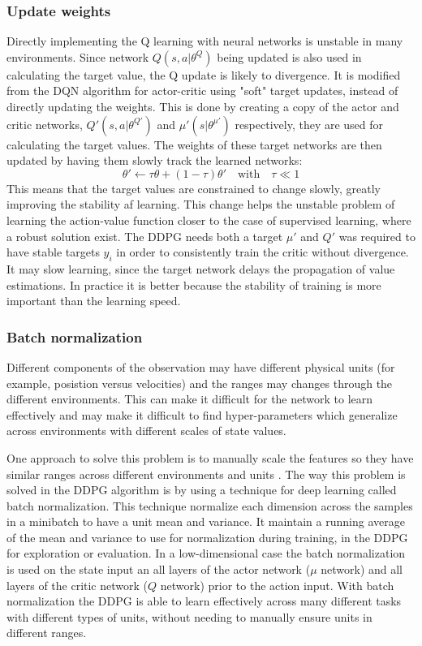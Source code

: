 \subsubsection{Update weights}
Directly implementing the Q learning with neural networks is unstable in many environments. Since network $Q(s,a|\theta^Q)$ being updated is also used in calculating the target value, the Q update is likely to divergence. It is modified from the DQN algorithm for actor-critic using "soft" target updates, instead of directly updating the weights. This is done by creating a copy of the actor and critic networks, $Q'(s,a|\theta^{Q'})$ and $\mu'(s|\theta^{\mu'})$ respectively, they are used for calculating the target values. The weights of these target networks are then updated by having them slowly track the learned networks:
\begin{equation}
\theta' \leftarrow \tau \theta + (1-\tau)\theta'   \quad \textrm{with} \quad \tau \ll 1 
\end{equation}   
This means that the target values are constrained to change slowly, greatly improving the stability af learning. This change helps the unstable problem of learning the action-value function closer to the case of supervised learning, where a robust solution exist. The DDPG needs both a target $\mu'$ and $Q'$ was required to have stable targets $y_i$ in order to consistently train the critic without divergence. It may slow learning, since the target network delays the propagation of value estimations. In practice it is better because the stability of training is more important than the learning speed.

\subsubsection{Batch normalization}
Different components of the observation may have different physical units (for example, posistion versus velocities) and the ranges may changes through the different environments. This can make it difficult for the network to learn effectively and may make it difficult to find hyper-parameters which generalize across environments with different scales of state values.

One approach to solve this problem is to manually scale the features so they have similar ranges across different environments and units . The way this problem is solved in the DDPG algorithm is by using a technique for deep learning called batch normalization. This technique normalize each dimension across the samples in a minibatch to have a unit mean and variance. It maintain a running average of the mean and variance to use for normalization during training, in the DDPG for exploration or evaluation. In a low-dimensional case the batch normalization is used on the state input an all layers of the actor network ($\mu$ network) and all layers of the critic network ($Q$ network) prior to the action input. With batch normalization the DDPG is able to learn effectively across many different tasks with different types of units, without needing to manually ensure units in different ranges.

